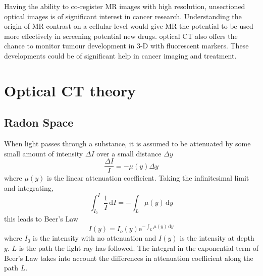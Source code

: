 	Having the ability to co-register MR images with high resolution, unsectioned optical images  is of significant  interest in cancer research. Understanding the origin of MR contrast on a cellular level would give MR the potential to be used more effectively in screening potential new drugs. optical CT also offers the chance to monitor tumour development in 3-D with fluorescent markers. These developments could be of significant help  in cancer imaging and treatment.
	
	
	
	
	
	\section{Optical CT theory}
	\label{sec:theory}
	
	
	
	
	\subsection{Radon Space}
	
	When light passes through a substance, it is assumed to be attenuated by some small amount of intensity $\Delta I$ over a small distance $\Delta y$ 
	\begin{equation}
	\dfrac{\Delta I}{I} = -\mu(y)\Delta y
	\end{equation}
	where $\mu(y)$ is the linear attenuation coefficient.
	Taking the infinitesimal limit and integrating, 
	\begin{equation}
	\int_{I_0}^{I} \frac{1}{I}\, \mathrm{d}I = - \int_L \mu(y)\, \mathrm{d}y
	\end{equation}
	this leads to Beer's Law 
	\begin{equation}
	I(y) = I_{o}(y)\mathrm{e}^{-\int_L \mu(y)\, \mathrm{d}y}
	\label{eq:Beer}
	\end{equation}
	where $I_0$ is the intensity with no attenuation and $I(y)$ is the intensity at depth $y$. $L$ is the path the light ray has followed. The integral in the exponential term of Beer's Law takes into account the differences in attenuation coefficient along the path $L$. 
	
